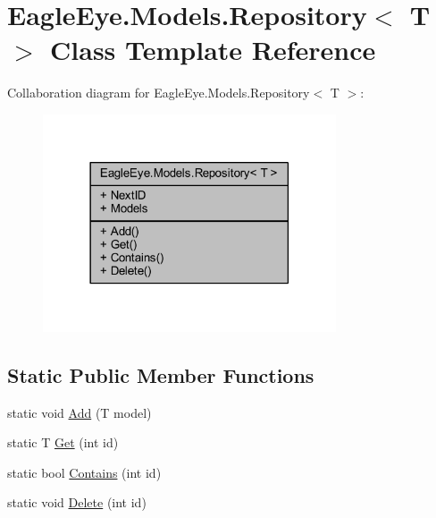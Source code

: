 \hypertarget{class_eagle_eye_1_1_models_1_1_repository}{}\section{Eagle\+Eye.\+Models.\+Repository$<$ T $>$ Class Template Reference}
\label{class_eagle_eye_1_1_models_1_1_repository}


 




Collaboration diagram for Eagle\+Eye.\+Models.\+Repository$<$ T $>$\+:\nopagebreak
\begin{figure}[H]
\begin{center}
\leavevmode
\includegraphics[width=246pt]{class_eagle_eye_1_1_models_1_1_repository__coll__graph}
\end{center}
\end{figure}
\subsection*{Static Public Member Functions}
\begin{DoxyCompactItemize}
\item 
static void \mbox{\hyperlink{class_eagle_eye_1_1_models_1_1_repository_aca9fded0480d870f0ec7837700243a2b}{Add}} (T model)
\item 
static T \mbox{\hyperlink{class_eagle_eye_1_1_models_1_1_repository_ac44cb18d8cbb605d3f7e14eb09c8c0bf}{Get}} (int id)
\item 
static bool \mbox{\hyperlink{class_eagle_eye_1_1_models_1_1_repository_ad94aecd681043ac78cd50dcde4aaeb0d}{Contains}} (int id)
\item 
static void \mbox{\hyperlink{class_eagle_eye_1_1_models_1_1_repository_ad50f201c8f5f1c7794ddf068ed459854}{Delete}} (int id)
\end{DoxyCompactItemize}
